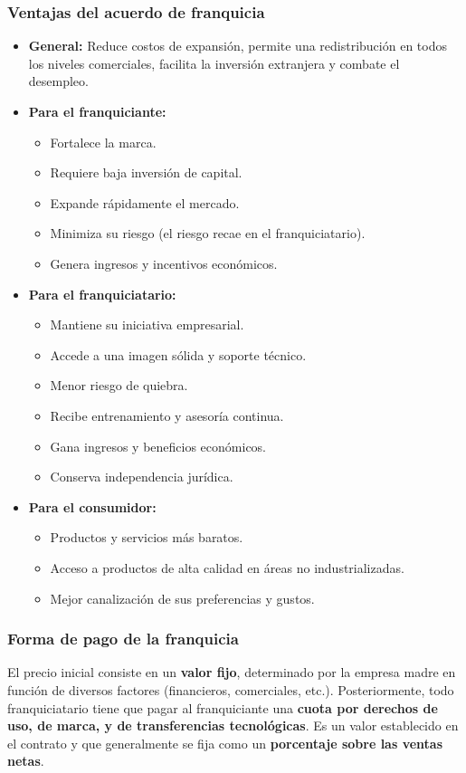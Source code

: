 \documentclass{templateNote}
\begin{document}
\subsubsection*{Ventajas del acuerdo de franquicia}
\begin{itemize}
    \item \textbf{General:} Reduce costos de expansión, permite una redistribución en todos los niveles comerciales, facilita la inversión extranjera y combate el desempleo.
    \item \textbf{Para el franquiciante:}
    \begin{itemize}
        \item Fortalece la marca.
        \item Requiere baja inversión de capital.
        \item Expande rápidamente el mercado.
        \item Minimiza su riesgo (el riesgo recae en el franquiciatario).
        \item Genera ingresos y incentivos económicos.
    \end{itemize}
    \item \textbf{Para el franquiciatario:}
    \begin{itemize}
        \item Mantiene su iniciativa empresarial.
        \item Accede a una imagen sólida y soporte técnico.
        \item Menor riesgo de quiebra.
        \item Recibe entrenamiento y asesoría continua.
        \item Gana ingresos y beneficios económicos.
        \item Conserva independencia jurídica.
    \end{itemize}
    \item \textbf{Para el consumidor:}
    \begin{itemize}
        \item Productos y servicios más baratos.
        \item Acceso a productos de alta calidad en áreas no industrializadas.
        \item Mejor canalización de sus preferencias y gustos.
    \end{itemize}
\end{itemize}

\subsubsection*{Forma de pago de la franquicia}
El precio inicial consiste en un \textbf{valor fijo}, determinado por la empresa madre en función de diversos factores (financieros, comerciales, etc.).
Posteriormente, todo franquiciatario tiene que pagar al franquiciante una \textbf{cuota por derechos de uso, de marca, y de transferencias tecnológicas}. Es un valor establecido en el contrato y que generalmente se fija como un \textbf{porcentaje sobre las ventas netas}.
\end{document}
